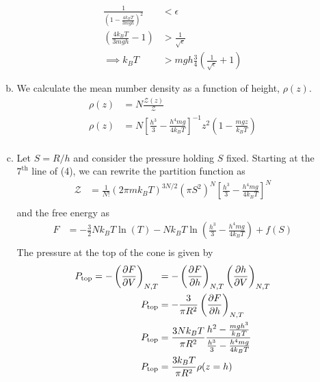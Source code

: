 \documentclass[]{book}
\begin{document}
\begin{enumerate}[1)]
\begin{enumerate}[a)]
\begin{equation}
\begin{split}
\frac{1}{\left( 1- \frac{4k_BT}{3mgh }\right)^2} & < \epsilon \\
\left( \frac{4k_BT}{3mgh } -1 \right) & > \frac{1}{\sqrt{\epsilon}} \\
\implies k_BT & > mgh\frac{3}{4} \left(\frac{1}{\sqrt{\epsilon}} + 1 \right)
\end{split}
\end{equation}
\item We calculate the mean number density as a function of height, $\rho(z)$.
\begin{equation}
\begin{split}
\rho(z) & = N \frac{\mathcal{Z}(z)}{\mathcal{Z}} \\
\rho(z) & = N \left[ \frac{h^3}{3} - \frac{h^4mg}{4k_BT} \right]^{-1} z^2 \left( 1-\frac{mgz}{k_BT} \right) \\
\end{split}
\end{equation}
\item 
Let $S = R/h$ and consider the pressure holding $S$ fixed. Starting at the $7^{\text{th}}$ line of (4), we can rewrite the partition function as 
\begin{equation}
\begin{split}
\mathcal{Z} & = \frac{1}{N!}\left(2\pi m k_BT\right)^{3N/2} \left(\pi S^2 \right)^N \left[ \frac{h^3}{3} - \frac{h^4mg}{4k_BT} \right]^{N}  \\
\end{split}
\end{equation}
and the free energy as
\begin{equation}
\begin{split}
F & = -\frac{3}{2}Nk_BT\ln(T) -Nk_BT \ln(\frac{h^3}{3} - \frac{h^4mg}{4k_BT}) + f(S) \\
\end{split}
\end{equation}
The pressure at the top of the cone is given by
\begin{equation}
\begin{split}
P_{\text{top}} = -\left( \pdv{F}{V}\right)_{N,T} & = -\left( \pdv{F}{h}\right)_{N,T}\left( \pdv{h}{V} \right)_{N,T} \\ 
P_{\text{top}} & = - \frac{3}{\pi R^2}\left( \pdv{F}{h}\right)_{N,T} \\
P_{\text{top}} & = \frac{3Nk_BT}{\pi R^2 }\frac{h^2 - \frac{mgh^3}{k_BT}}{\frac{h^3}{3} - \frac{h^4mg}{4k_BT}} \\
P_{\text{top}} & = \frac{3k_BT}{\pi R^2 } \rho(z=h)  \\

\end{split}
\end{equation}
\end{enumerate}
\end{enumerate}
\end{document}
